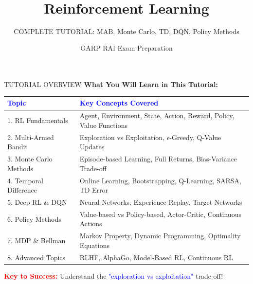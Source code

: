 \documentclass[8pt]{beamer}
\title{Reinforcement Learning}
\subtitle{COMPLETE TUTORIAL: MAB, Monte Carlo, TD, DQN, Policy Methods}
\author{GARP RAI Exam Preparation}
\date{}
\begin{document}
	
	\begin{frame}
		\titlepage
	\end{frame}
	
	
	\begin{frame}{TUTORIAL OVERVIEW}
		\fontsize{7}{8}\selectfont
		\textbf{What You Will Learn in This Tutorial:}
		
		\vspace{0.2cm}
		\begin{tabular}{|p{2.5cm}|p{5.5cm}|}
			\hline
			\textcolor{blue}{Topic} & \textcolor{blue}{Key Concepts Covered} \\
			\hline
			1. RL Fundamentals & Agent, Environment, State, Action, Reward, Policy, Value Functions \\
			\hline
			2. Multi-Armed Bandit & Exploration vs Exploitation, $\epsilon$-Greedy, Q-Value Updates \\
			\hline
			3. Monte Carlo Methods & Episode-based Learning, Full Returns, Bias-Variance Trade-off \\
			\hline
			4. Temporal Difference & Online Learning, Bootstrapping, Q-Learning, SARSA, TD Error \\
			\hline
			5. Deep RL \& DQN & Neural Networks, Experience Replay, Target Networks \\
			\hline
			6. Policy Methods & Value-based vs Policy-based, Actor-Critic, Continuous Actions \\
			\hline
			7. MDP \& Bellman & Markov Property, Dynamic Programming, Optimality Equations \\
			\hline
			8. Advanced Topics & RLHF, AlphaGo, Model-Based RL, Continuous RL \\
			\hline
		\end{tabular}
		
		\textcolor{red}{\textbf{Key to Success:}} Understand the \textcolor{blue}{"exploration vs exploitation"} trade-off!
	\end{frame}
	
\end{document}
